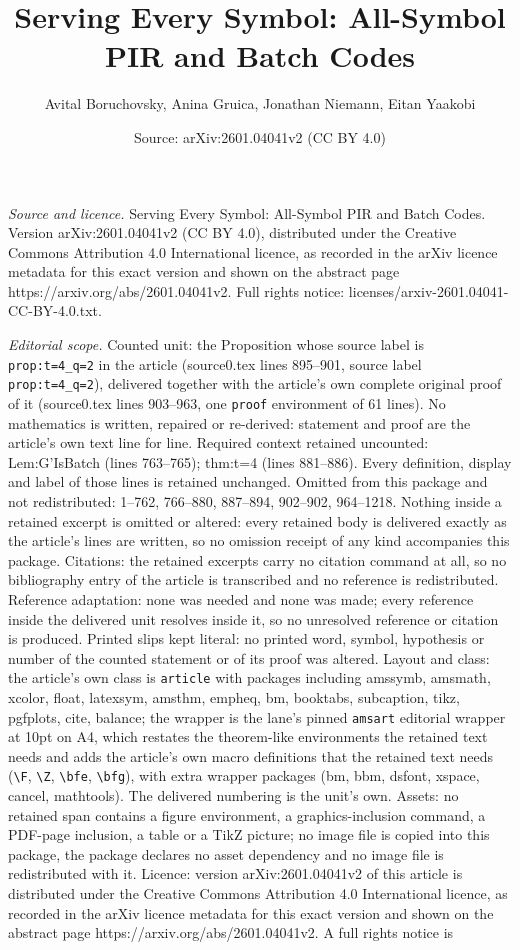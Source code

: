 \documentclass[10pt,a4paper]{amsart}
\title[Serving Every Symbol: All-Symbol PIR and Batch Codes]{Serving Every Symbol: All-Symbol PIR and Batch Codes}
\author{Avital Boruchovsky, Anina Gruica, Jonathan Niemann, Eitan Yaakobi}
\date{Source: arXiv:2601.04041v2 (CC BY 4.0)}
\begin{document}
\maketitle

\noindent\emph{Source and licence.} Serving Every Symbol: All-Symbol PIR and Batch Codes. Version arXiv:2601.04041v2 (CC BY 4.0), distributed under the Creative Commons Attribution 4.0 International licence, as recorded in the arXiv licence metadata for this exact version and shown on the abstract page https://arxiv.org/abs/2601.04041v2. Full rights notice: licenses/arxiv-2601.04041-CC-BY-4.0.txt.\par\smallskip

\noindent\textit{Editorial scope.} Counted unit: the Proposition whose source label is \texttt{prop:t=4\_q=2} in the article (source0.tex lines 895--901, source label \texttt{prop:t=4\_q=2}), delivered together with the article's own complete original proof of it (source0.tex lines 903--963, one \texttt{proof} environment of 61 lines). No mathematics is written, repaired or re-derived: statement and proof are the article's own text line for line. Required context retained uncounted: Lem:G'IsBatch (lines 763--765); thm:t=4 (lines 881--886). Every definition, display and label of those lines is retained unchanged. Omitted from this package and not redistributed: 1--762, 766--880, 887--894, 902--902, 964--1218. Nothing inside a retained excerpt is omitted or altered: every retained body is delivered exactly as the article's lines are written, so no omission receipt of any kind accompanies this package. Citations: the retained excerpts carry no citation command at all, so no bibliography entry of the article is transcribed and no reference is redistributed. Reference adaptation: none was needed and none was made; every reference inside the delivered unit resolves inside it, so no unresolved reference or citation is produced. Printed slips kept literal: no printed word, symbol, hypothesis or number of the counted statement or of its proof was altered. Layout and class: the article's own class is \texttt{article} with packages including amssymb, amsmath, xcolor, float, latexsym, amsthm, empheq, bm, booktabs, subcaption, tikz, pgfplots, cite, balance; the wrapper is the lane's pinned \texttt{amsart} editorial wrapper at 10pt on A4, which restates the theorem-like environments the retained text needs and adds the article's own macro definitions that the retained text needs (\texttt{\textbackslash F}, \texttt{\textbackslash Z}, \texttt{\textbackslash bfe}, \texttt{\textbackslash bfg}), with extra wrapper packages (bm, bbm, dsfont, xspace, cancel, mathtools). The delivered numbering is the unit's own. Assets: no retained span contains a figure environment, a graphics-inclusion command, a PDF-page inclusion, a table or a TikZ picture; no image file is copied into this package, the package declares no asset dependency and no image file is redistributed with it. Licence: version arXiv:2601.04041v2 of this article is distributed under the Creative Commons Attribution 4.0 International licence, as recorded in the arXiv licence metadata for this exact version and shown on the abstract page https://arxiv.org/abs/2601.04041v2. A full rights notice is 
\end{document}
